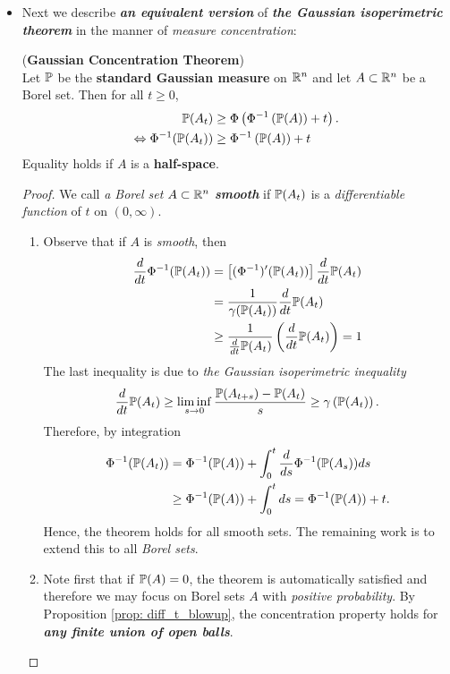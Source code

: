 \documentclass[11pt]{article}
\begin{document}
\begin{itemize}
\item Next we describe \emph{\textbf{an equivalent version}} of \emph{\textbf{the Gaussian isoperimetric theorem}} in the manner of \emph{measure concentration}:
\begin{theorem} (\textbf{Gaussian Concentration Theorem}) \citep{boucheron2013concentration} \citep{boucheron2013concentration, vershynin2018high, wainwright2019high}\\
Let ${\mathbb P}$ be the \textbf{standard Gaussian measure} on ${\mathbb R}^n$ and let $A \subset {\mathbb R}^n$ be a Borel set. Then for all $t \ge 0$, 
\begin{align}
{\mathbb P}(A_t) &\ge \Phi\left(\Phi^{-1}\left({\mathbb P}(A)\right) + t\right). \label{ineqn: gaussian_concentration_inequality}\\
\Leftrightarrow \Phi^{-1}({\mathbb P}(A_t)) & \ge \Phi^{-1}\left({\mathbb P}(A)\right) + t \nonumber
\end{align} Equality holds if $A$ is a \textbf{half-space}.
\end{theorem}
\begin{proof}
We call \emph{a Borel set} $A \subset {\mathbb R}^n$ \emph{\textbf{smooth}} if ${\mathbb P}(A_t)$ is a \emph{differentiable function} of $t$ on $(0, \infty)$. 
\begin{enumerate}
\item Observe that if $A$ is \emph{smooth}, then
\begin{align*}
\frac{d}{dt}\Phi^{-1}({\mathbb P}(A_t)) &= \left[(\Phi^{-1})'({\mathbb P}(A_t))\right] \frac{d}{dt}{\mathbb P}(A_t) \\
&= \frac{1}{\gamma({\mathbb P}(A_t))}  \frac{d}{dt}{\mathbb P}(A_t) \\
& \ge \frac{1}{\frac{d}{dt}{\mathbb P}(A_t)}\left(\frac{d}{dt}{\mathbb P}(A_t) \right)= 1
\end{align*} The last inequality is due to \emph{the Gaussian isoperimetric inequality}
\begin{align*}
\frac{d}{dt}{\mathbb P}(A_{t}) \ge \liminf\limits_{s \to 0}\frac{{\mathbb P}(A_{t+s}) - {\mathbb P}(A_{t})}{s} \ge \gamma\left({\mathbb P}(A_t)\right).
\end{align*} Therefore, by integration 
\begin{align*}
\Phi^{-1}({\mathbb P}(A_t))  &= \Phi^{-1}({\mathbb P}(A)) + \int_{0}^{t} \frac{d}{ds}\Phi^{-1}({\mathbb P}(A_s))  ds \\
&\ge  \Phi^{-1}({\mathbb P}(A)) + \int_{0}^{t}ds = \Phi^{-1}({\mathbb P}(A)) + t. 
\end{align*} Hence, the theorem holds for all smooth sets. The remaining work is to extend this to all \emph{Borel sets}.


\item Note first that if ${\mathbb P}(A) = 0$, the theorem is automatically satisfied and therefore we may focus on Borel sets $A$ with \emph{positive probability}. By Proposition \ref{prop: diff_t_blowup}, the concentration property holds for \emph{\textbf{any finite union of open balls}}.


\end{enumerate}
\end{proof}
\end{itemize}
\end{document}
